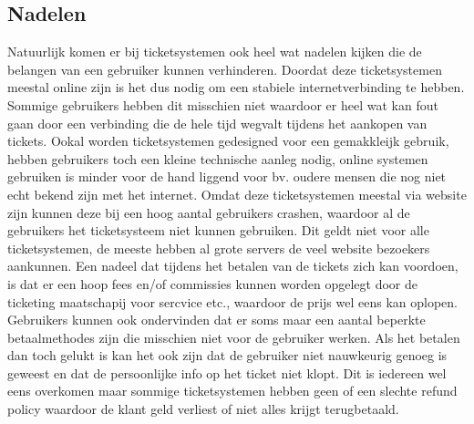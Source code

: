 \subsection{Nadelen}
Natuurlijk komen er bij ticketsystemen ook heel wat nadelen kijken die de belangen van een gebruiker kunnen verhinderen. Doordat deze ticketsystemen meestal online zijn is het dus nodig om een stabiele internetverbinding te hebben.
Sommige gebruikers hebben dit misschien niet waardoor er heel wat kan fout gaan door een verbinding die de hele tijd wegvalt tijdens het aankopen van tickets. Ookal worden ticketsystemen gedesigned voor een gemakkleijk gebruik,
hebben gebruikers toch een kleine technische aanleg nodig, online systemen gebruiken is minder voor de hand liggend voor bv. oudere mensen die nog niet echt bekend zijn met het internet.
Omdat deze ticketsystemen meestal via website zijn kunnen deze bij een hoog aantal gebruikers crashen, waardoor al de gebruikers het ticketsysteem niet kunnen gebruiken. Dit geldt niet voor alle ticketsystemen, de meeste hebben al grote servers de veel website bezoekers aankunnen.
Een nadeel dat tijdens het betalen van de tickets zich kan voordoen, is dat er een hoop fees en/of commissies kunnen worden opgelegt door de ticketing maatschapij voor sercvice etc., waardoor de prijs wel eens kan oplopen. 
Gebruikers kunnen ook ondervinden dat er soms maar een aantal beperkte betaalmethodes zijn die misschien niet voor de gebruiker werken. Als het betalen dan toch gelukt is kan het ook zijn dat de gebruiker niet nauwkeurig genoeg is geweest en dat de persoonlijke info op het ticket niet klopt.
Dit is iedereen wel eens overkomen maar sommige ticketsystemen hebben geen of een slechte refund policy waardoor de klant geld verliest of niet alles krijgt terugbetaald. 

